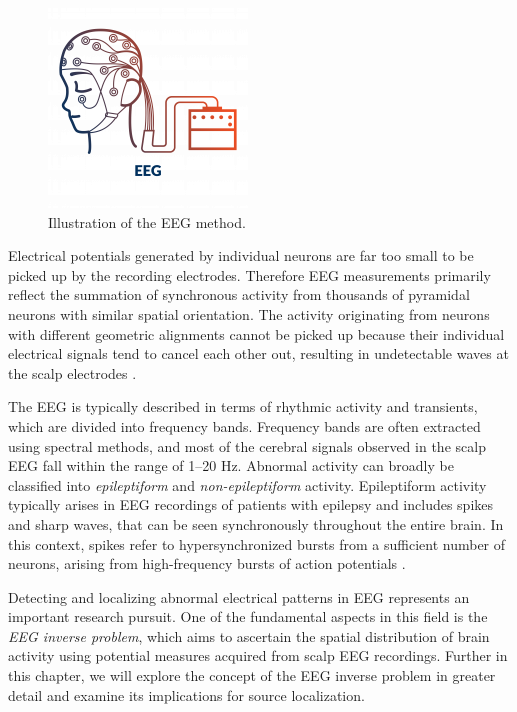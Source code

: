 \documentclass[a4paper, UKenglish, 11pt]{uiomaster}
\begin{document}
\begin{figure}[!htb]
    \centering
    \includegraphics[width=0.4\linewidth]{figures/EEG.png}
    \caption{Illustration of the EEG method. }
    \label{fig:EEG}
\end{figure}

Electrical potentials generated by individual neurons are far too small to be picked up by the recording electrodes. Therefore EEG measurements primarily reflect the summation of synchronous activity from thousands of pyramidal neurons with similar spatial orientation. The activity originating from neurons with different geometric alignments cannot be picked up because their individual electrical signals tend to cancel each other out, resulting in undetectable waves at the scalp electrodes \cite{bromfield2006introduction}.

The EEG is typically described in terms of rhythmic activity and transients, which are divided into frequency bands. Frequency bands are often extracted using spectral methods, and most of the cerebral signals observed in the scalp EEG fall within the range of 1–20 Hz. Abnormal activity can broadly be classified into \emph{epileptiform} and \emph{non-epileptiform} activity. Epileptiform activity typically arises in EEG recordings of patients with epilepsy and includes spikes and sharp waves, that can be seen synchronously throughout the entire brain. In this context, spikes refer to hypersynchronized bursts from a sufficient number of neurons, arising from high-frequency bursts of action potentials \cite{bromfield2006introduction}.

Detecting and localizing abnormal electrical patterns in EEG represents an important research pursuit. One of the fundamental aspects in this field is the \emph{EEG inverse problem}, which aims to ascertain the spatial distribution of brain activity using potential measures acquired from scalp EEG recordings. Further in this chapter, we will explore the concept of the EEG inverse problem in greater detail and examine its implications for source localization.
\end{document}
